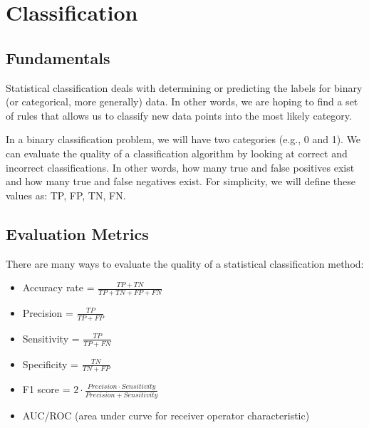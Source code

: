 \documentclass[
  11pt,
]{book}
\theoremstyle{definition}
\theoremstyle{definition}
\theoremstyle{definition}
\theoremstyle{definition}
\theoremstyle{remark}
\begin{document}
\hypertarget{classification}{%
\chapter{Classification}\label{classification}}

\hypertarget{fundamentals}{%
\section{Fundamentals}\label{fundamentals}}

Statistical classification deals with determining or predicting the labels for binary (or categorical, more generally) data. In other words, we are hoping to find a set of rules that allows us to classify new data points into the most likely category.

In a binary classification problem, we will have two categories (e.g., 0 and 1). We can evaluate the quality of a classification algorithm by looking at correct and incorrect classifications. In other words, how many true and false positives exist and how many true and false negatives exist. For simplicity, we will define these values as: TP, FP, TN, FN.

\vfill

\hypertarget{evaluation-metrics}{%
\section{Evaluation Metrics}\label{evaluation-metrics}}

There are many ways to evaluate the quality of a statistical classification method:

\begin{itemize}
\item Accuracy rate = $\frac{TP+TN}{TP+TN+FP+FN}$

\item Precision = $\frac{TP}{TP+FP}$

\item Sensitivity = $\frac{TP}{TP+FN}$

\item Specificity = $\frac{TN}{TN+FP}$

\item F1 score = $2 \cdot \frac{Precision \cdot Sensitivity}{Precision + Sensitivity}$

\item AUC/ROC (area under curve for receiver operator characteristic)
\end{itemize}
\end{document}
